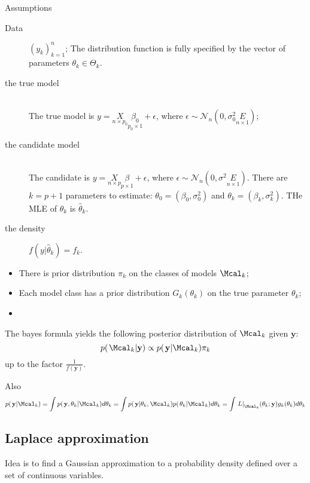 \documentclass[a4paper]{article}
\newcommand{\brac}[1]{{\left ( #1 \right )}}
\newcommand{\induc}[1]{{\left . #1 \right \vert}}
\newcommand{\Ncal}{\mathcal{N}}
\begin{document}
Assumptions \begin{description}
	\item[Data] $\brac{y_k}_{k=1}^n$;
	\itme[Parametric] The distribution function is fully specified by the vector of parameters $\theta_k\in \Theta_k$.
	\item[the true model]\hfill\\
	The true model is $y = \underset{n\times p_0}{X}\underset{p_0\times 1}{\beta_0} + \epsilon$, where $\epsilon \sim \Ncal_n\brac{0,\sigma_0^2 \underset{n\times 1}{E}}$;
	\item[the candidate model] \hfill\\
	The candidate is $y = \underset{n\times p}{X}\underset{p\times 1}{\beta} + \epsilon$, where $\epsilon \sim \Ncal_n\brac{0,\sigma^2 \underset{n\times 1}{E}}$.
	There are $k=p+1$ parameters to estimate: $\theta_0 = \brac{\beta_0,\sigma_0^2}$ and $\theta_k = \brac{\beta_k,\sigma_k^2}$. THe MLE of $\theta_k$ is $\hat{\theta}_k$.
	\item[the density] $f\brac{\induc{y}\hat{\theta}_k} = f_k$.
\end{description}

\begin{itemize}
	\item There is prior distribution $\pi_k$ on the classes of models $\Mcal_k$;
	\item Each model class has a prior distribution $G_k\brac{\theta_k}$ on the true parameter $\theta_k$;
	\item 
\end{itemize}
The bayes formula yields the following posterior distribution of $\Mcal_k$ given $\mathbf{y}$:
\[p\brac{\induc{\Mcal_k}\mathbf{y}} \propto p\brac{\induc{\mathbf{y}}\Mcal_k} \pi_k\]
up to the factor $\frac{1}{f(\mathbf{y})}$.

Also
\[p\brac{\induc{\mathbf{y}}\Mcal_k}
= \int p\brac{\induc{\mathbf{y}, \theta_k}\Mcal_k} d\theta_k
= \int p\brac{\induc{\mathbf{y}}\theta_k, \Mcal_k} p\brac{\induc{\theta_k}\Mcal_k}d\theta_k
= \int \induc{L}_{\Mcal_k}(\theta_k;\mathbf{y}) g_k(\theta_k) d\theta_k\]

\subsection{Laplace approximation} %
\label{sub:laplace_approximation}

Idea is to find a Gaussian approximation to a probability density defined over a set of continuous variables.
\end{document}
